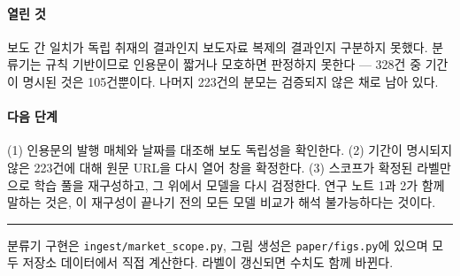 \documentclass[10pt]{article}
\begin{document}
\paragraph{열린 것}
보도 간 일치가 독립 취재의 결과인지 보도자료 복제의 결과인지 구분하지 못했다.
분류기는 규칙 기반이므로 인용문이 짧거나 모호하면 판정하지 못한다 --- 328건 중 기간이
명시된 것은 105건뿐이다. 나머지 223건의 분모는 검증되지 않은 채로 남아 있다.

\paragraph{다음 단계}
(1) 인용문의 발행 매체와 날짜를 대조해 보도 독립성을 확인한다.
(2) 기간이 명시되지 않은 223건에 대해 원문 URL을 다시 열어 창을 확정한다.
(3) 스코프가 확정된 라벨만으로 학습 풀을 재구성하고, 그 위에서 모델을 다시 검정한다.
연구 노트 1과 2가 함께 말하는 것은, 이 재구성이 끝나기 전의 모든 모델 비교가
해석 불가능하다는 것이다.

\vspace{0.7em}
\hrule
\vspace{0.4em}
{\footnotesize\color{black!60}
분류기 구현은 \texttt{ingest/market\_scope.py}, 그림 생성은 \texttt{paper/figs.py}에 있으며
모두 저장소 데이터에서 직접 계산한다. 라벨이 갱신되면 수치도 함께 바뀐다.}
\end{document}
